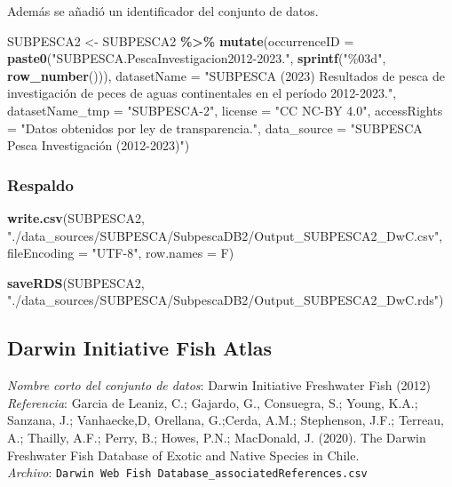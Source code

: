 \documentclass[sn-apa,pdflatex]{sn-jnl}
\newenvironment{Shaded}{\begin{snugshade}}{\end{snugshade}}
\newcommand{\AttributeTok}[1]{\textcolor[rgb]{0.13,0.29,0.53}{#1}}
\newcommand{\FunctionTok}[1]{\textcolor[rgb]{0.13,0.29,0.53}{\textbf{#1}}}
\newcommand{\NormalTok}[1]{#1}
\newcommand{\OtherTok}[1]{\textcolor[rgb]{0.56,0.35,0.01}{#1}}
\newcommand{\SpecialCharTok}[1]{\textcolor[rgb]{0.81,0.36,0.00}{\textbf{#1}}}
\newcommand{\StringTok}[1]{\textcolor[rgb]{0.31,0.60,0.02}{#1}}
\begin{document}
Además se añadió un identificador del conjunto de datos.

\begin{Shaded}
\begin{Highlighting}[]
\NormalTok{SUBPESCA2 }\OtherTok{\textless{}{-}}\NormalTok{ SUBPESCA2 }\SpecialCharTok{\%\textgreater{}\%}
    \FunctionTok{mutate}\NormalTok{(}\AttributeTok{occurrenceID =} \FunctionTok{paste0}\NormalTok{(}\StringTok{"SUBPESCA.PescaInvestigacion2012{-}2023."}\NormalTok{,}
        \FunctionTok{sprintf}\NormalTok{(}\StringTok{"\%03d"}\NormalTok{, }\FunctionTok{row\_number}\NormalTok{())), }\AttributeTok{datasetName =} \StringTok{"SUBPESCA (2023) Resultados de pesca de investigación  de peces de aguas continentales en el período 2012{-}2023."}\NormalTok{,}
        \AttributeTok{datasetName\_tmp =} \StringTok{"SUBPESCA{-}2"}\NormalTok{, }\AttributeTok{license =} \StringTok{"CC NC{-}BY 4.0"}\NormalTok{,}
        \AttributeTok{accessRights =} \StringTok{"Datos obtenidos por ley de transparencia."}\NormalTok{,}
        \AttributeTok{data\_source =} \StringTok{"SUBPESCA Pesca Investigación (2012{-}2023)"}\NormalTok{)}
\end{Highlighting}
\end{Shaded}

\subsubsection{Respaldo}\label{respaldo-5}

\begin{Shaded}
\begin{Highlighting}[]
\FunctionTok{write.csv}\NormalTok{(SUBPESCA2, }\StringTok{"./data\_sources/SUBPESCA/SubpescaDB2/Output\_SUBPESCA2\_DwC.csv"}\NormalTok{,}
    \AttributeTok{fileEncoding =} \StringTok{"UTF{-}8"}\NormalTok{, }\AttributeTok{row.names =}\NormalTok{ F)}

\FunctionTok{saveRDS}\NormalTok{(SUBPESCA2, }\StringTok{"./data\_sources/SUBPESCA/SubpescaDB2/Output\_SUBPESCA2\_DwC.rds"}\NormalTok{)}
\end{Highlighting}
\end{Shaded}

\subsection{Darwin Initiative Fish
Atlas}\label{darwin-initiative-fish-atlas}

\emph{Nombre corto del conjunto de datos}: Darwin Initiative Freshwater
Fish (2012)\\
\emph{Referencia}: Garcia de Leaniz, C.; Gajardo, G., Consuegra, S.;
Young, K.A.; Sanzana, J.; Vanhaecke,D, Orellana, G.;Cerda, A.M.;
Stephenson, J.F.; Terreau, A.; Thailly, A.F.; Perry, B.; Howes, P.N.;
MacDonald, J. (2020). The Darwin Freshwater Fish Database of Exotic and
Native Species in Chile. \citep{Leaniz2020}\\
\emph{Archivo}:
\texttt{Darwin\ Web\ Fish\ Database\_associatedReferences.csv}
\end{document}
